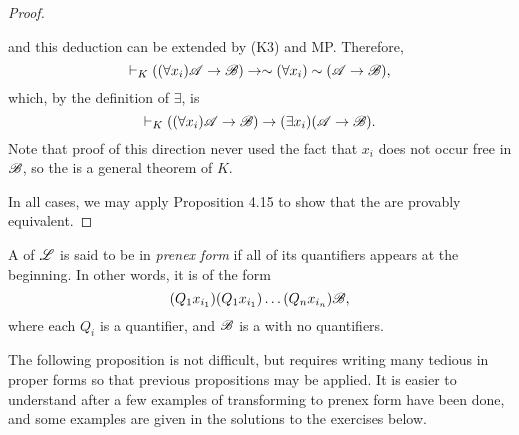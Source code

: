 \begin{proposition}
\begin{proof}
\begin{enumerate}
\begin{enumerate}
            and this deduction can be extended by (K3) and MP. Therefore,
            \[\vdash_{K} ((\forall x_i)\mathscr{A} \rightarrow \mathscr{B}) \rightarrow \sim(\forall x_i)\sim(\mathscr{A} \rightarrow \mathscr{B}),\]
            which, by the definition of \(\exists\), is
            \[\vdash_{K} ((\forall x_i)\mathscr{A} \rightarrow \mathscr{B}) \rightarrow (\exists x_i)(\mathscr{A} \rightarrow \mathscr{B}).\]
            Note that proof of this direction never used the fact that \(x_i\) does not occur free in \(\mathscr{B}\), so the \wf{} is a general theorem of \(K\).
        \end{enumerate}
    \end{enumerate}
    In all cases, we may apply Proposition 4.15 to show that the \wfs{} are provably equivalent.
  \end{proof}
\end{proposition}

\setcounter{definition}{26}
\begin{definition}
  A \wf{} of \(\mathscr{L}\) is said to be in \textit{prenex form} if all of its quantifiers appears at the beginning. In other words, it is of the form 
  \[(Q_1 x_{i_1})(Q_1 x_{i_1}) \dots (Q_n x_{i_n})\mathscr{B},\]
  where each \(Q_i\) is a quantifier, and \(\mathscr{B}\) is a \wf{} with no quantifiers.
\end{definition}

The following proposition is not difficult, but requires writing many tedious \wfs{} in proper forms so that previous propositions may be applied. It is easier to understand after a few examples of transforming \wfs{} to prenex form have been done, and some examples are given in the solutions to the exercises below.

